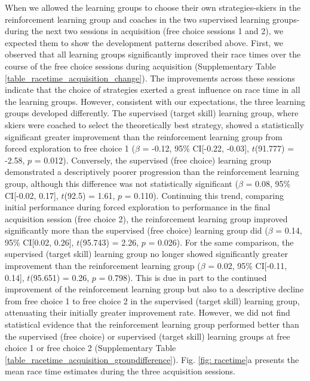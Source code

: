 When we allowed the learning groups to choose their own strategies-skiers in the reinforcement learning group and coaches in the two supervised learning groups-during the next two sessions in acquisition (free choice sessions 1 and 2), we expected them to show the development patterns described above. First, we observed that all learning groups significantly improved their race times over the course of the free choice sessions during acquisition (Supplementary Table \ref{table_racetime_acquisition_change}). The improvements across these sessions indicate that the choice of strategies exerted a great influence on race time in all the learning groups. However, consistent with our expectations, the three learning groups developed differently. The supervised (target skill) learning group, where skiers were coached to select the theoretically best strategy, showed a statistically significant greater improvement than the reinforcement learning group from forced exploration to free choice 1 ($\beta$ = -0.12, 95\% CI[-0.22, -0.03], $t$(91.777) = -2.58, $p$ = 0.012). Conversely, the supervised (free choice) learning group demonstrated a descriptively poorer progression than the reinforcement learning group, although this difference was not statistically significant ($\beta$ = 0.08, 95\% CI[-0.02, 0.17], $t$(92.5) = 1.61, $p$ = 0.110). Continuing this trend, comparing initial performance during forced exploration to performance in the final acquisition session (free choice 2), the reinforcement learning group improved significantly more than the supervised (free choice) learning group did ($\beta$ = 0.14, 95\% CI[0.02, 0.26], $t$(95.743) = 2.26, $p$ = 0.026). For the same comparison, the supervised (target skill) learning group no longer showed significantly greater improvement than the reinforcement learning group  ($\beta$ = 0.02, 95\% CI[-0.11, 0.14], $t$(95.651) = 0.26, $p$ = 0.798). This is due in part to the continued improvement of the reinforcement learning group but also to a descriptive decline from free choice 1 to free choice 2 in the supervised (target skill) learning group, attenuating their initially greater improvement rate. However, we did not find statistical evidence that the reinforcement learning group performed better than the supervised (free choice) or supervised (target skill) learning groups at free choice 1 or free choice 2 (Supplementary Table \ref{table_racetime_acquisition_groupdifference}). Fig. \ref{fig: racetime}a presents the mean race time estimates during the three acquisition sessions. 

